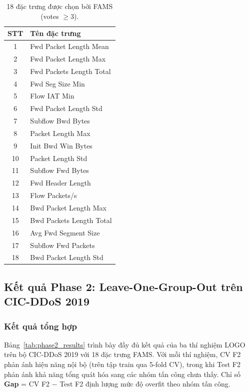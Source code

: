 \begin{table}[H]
\caption{18 đặc trưng được chọn bởi FAMS (votes $\geq 3$).}
\label{tab:fams_features}
\begin{center}
\begin{tabular}{|c|l|}
\hline
\textbf{STT} & \textbf{Tên đặc trưng} \\
\hline
1  & Fwd Packet Length Mean \\
2  & Fwd Packet Length Max \\
3  & Fwd Packets Length Total \\
4  & Fwd Seg Size Min \\
5  & Flow IAT Min \\
6  & Fwd Packet Length Std \\
7  & Subflow Bwd Bytes \\
8  & Packet Length Max \\
9  & Init Bwd Win Bytes \\
10 & Packet Length Std \\
11 & Subflow Fwd Bytes \\
12 & Fwd Header Length \\
13 & Flow Packets/s \\
14 & Bwd Packet Length Max \\
15 & Bwd Packets Length Total \\
16 & Avg Fwd Segment Size \\
17 & Subflow Fwd Packets \\
18 & Bwd Packet Length Std \\
\hline
\end{tabular}
\end{center}
\end{table}

\subsection{Kết quả Phase 2: Leave-One-Group-Out trên CIC-DDoS 2019}

\subsubsection{Kết quả tổng hợp}

Bảng~\ref{tab:phase2_results} trình bày đầy đủ kết quả của ba thí nghiệm LOGO trên bộ CIC-DDoS 2019 với 18 đặc trưng FAMS. Với mỗi thí nghiệm, CV F2 phản ánh hiệu năng nội bộ (trên tập train qua 5-fold CV), trong khi Test F2 phản ánh khả năng tổng quát hóa sang các nhóm tấn công chưa thấy. Chỉ số \textbf{Gap} = CV F2 $-$ Test F2 định lượng mức độ overfit theo nhóm tấn công.

